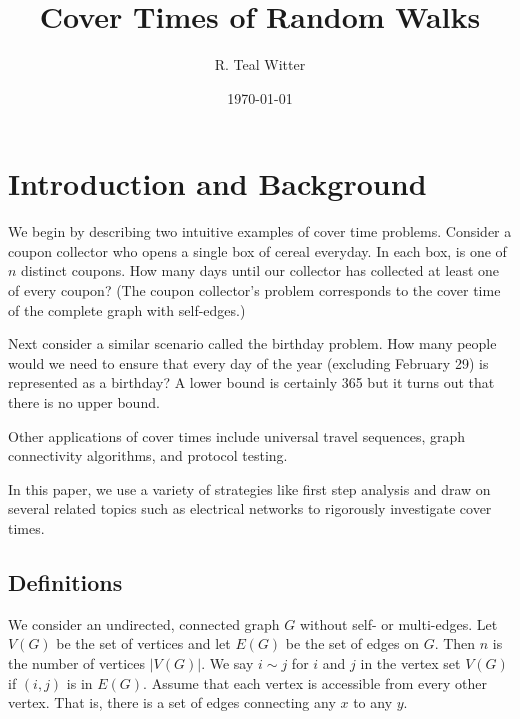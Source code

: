 \documentclass[12pt]{article}
\theoremstyle{definition}
\begin{document}
\title{Cover Times of Random Walks}


\author{R. Teal Witter}

\date{\today}



\maketitle


\newpage
\tableofcontents

\newpage
\section{Introduction and Background}

We begin by describing two intuitive examples of cover time problems.
Consider a coupon collector who opens a single box of cereal everyday.
In each box, is one of $n$ distinct coupons.
How many days until our collector has collected at least one of every coupon?
(The coupon collector's problem corresponds to the cover time of the complete
graph with self-edges.)

Next consider a similar scenario called the birthday problem.
How many people would we need to ensure that every day of the year
(excluding February 29) is represented as a birthday?
A lower bound is certainly 365 but it turns out that there is no upper bound.

Other applications of cover times include universal travel sequences,
graph connectivity algorithms, and protocol testing.

In this paper, we use a variety of strategies like first step analysis
and draw on several related topics such as electrical networks to rigorously
investigate cover times.

\subsection{Definitions}
We consider an undirected, connected graph $G$ without self- or multi-edges.
Let $V(G)$ be the set of vertices and let $E(G)$ be the set of edges on $G$.
Then $n$ is the number of vertices $|V(G)|$.
We say $i\sim j$ for $i$ and $j$ in the vertex set $V(G)$ if $(i,j)$ is in $E(G)$.
Assume that each vertex is accessible from every other vertex.
That is, there is a set of edges connecting any $x$ to any $y$.
\end{document}
